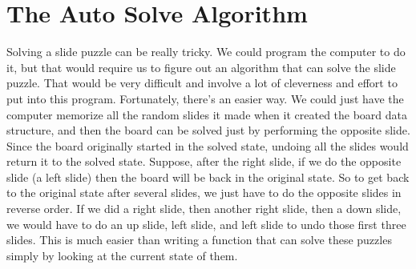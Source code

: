 \section{The Auto Solve Algorithm}
Solving a slide puzzle can be really tricky. We could program the computer to do it, but that would require us to figure out an algorithm that can solve the slide puzzle. That would be very difficult and involve a lot of cleverness and effort to put into this program.
Fortunately, there’s an easier way. We could just have the computer memorize all the random slides it made when it created the board data structure, and then the board can be solved just by performing the opposite slide. Since the board originally started in the solved state, undoing all the slides would return it to the solved state.
Suppose, after the right slide, if we do the opposite slide (a left slide) then the board will be back in the original state. So to get back to the original state after several slides, we just have to do the opposite slides in reverse order. If we did a right slide, then another right slide, then a down slide, we would have to do an up slide, left slide, and left slide to undo those first three slides. This is much easier than writing a function that can solve these puzzles simply by looking at the current state of them.







